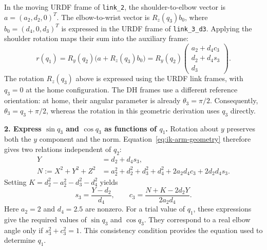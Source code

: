 In the moving URDF frame of \texttt{link\_2}, the shoulder-to-elbow vector is
$a=(a_2,d_2,0)^T$. The elbow-to-wrist vector is $R_z(q_3)b_0$, where
$b_0=(d_4,0,d_3)^T$ is expressed in the URDF frame of \texttt{link\_3\_d3}.
Applying the shoulder rotation maps their sum into the auxiliary frame:
\begin{equation}
 r(q_1)=R_y(q_2)\bigl(a+R_z(q_3)b_0\bigr)
       =R_y(q_2)\begin{pmatrix}
         a_2+d_4c_3\\d_2+d_4s_3\\d_3
       \end{pmatrix}.
 \label{eq:ik-arm-geometry}
\end{equation}
The rotation \(R_z(q_3)\) above is expressed using the URDF link frames, with \(q_3=0\) 
at the home configuration. The DH frames use a different reference orientation: at home, 
their angular parameter is already \(\theta_3=\pi/2\). Consequently, \(\theta_3=q_3+\pi/2\), 
whereas the rotation in this geometric derivation uses \(q_3\) directly.

\textbf{2. Express $\sin q_3$ and $\cos q_3$ as functions of $q_1$.}
Rotation about $y$ preserves both the $y$ component and the norm.
Equation~\eqref{eq:ik-arm-geometry} therefore gives two relations independent of $q_2$:
\begin{equation}
 \begin{aligned}
 Y&=d_2+d_4s_3,\\
 N:=X^2+Y^2+Z^2
  &=a_2^2+d_2^2+d_3^2+d_4^2+2a_2d_4c_3+2d_2d_4s_3.
 \end{aligned}
 \label{eq:ik-invariants}
\end{equation}
Setting $K=d_2^2-a_2^2-d_3^2-d_4^2$ yields
\begin{equation}
 s_3=\frac{Y-d_2}{d_4},
 \qquad c_3=\frac{N+K-2d_2Y}{2a_2d_4}.
 \label{eq:ik-elbow-functions}
\end{equation}
Here $a_2=2$ and $d_4=2.5$ are nonzero. For a trial value of \(q_1\), these expressions 
give the required values of \(\sin q_3\) and \(\cos q_3\). They correspond to 
a real elbow angle only if \(s_3^2+c_3^2=1\). This consistency condition provides 
the equation used to determine \(q_1\).

